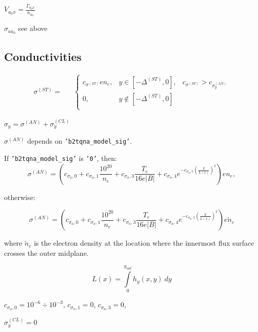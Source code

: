 \documentclass[a4paper,10pt]{report}
\begin{document}
$V_{a_{0}x}=\frac{\Gamma_{a_{0}x}}{n_{a_0}}$

$\sigma_{aa_0}$ see above

\subsection{Conductivities}

\begin{equation*}
\begin{matrix}
\sigma^{(ST)} = &
& \left\{
\begin{matrix}
c_{\sigma^{(ST)}} e n_e
, & y \in \left[ -\Delta^{(ST)},0 \right], & c_{\sigma^{(ST)}} > c_{\sigma^{(AN)}_{y}} \\
0, &  y \notin \left[ -\Delta^{(ST)},0 \right] \\
\end{matrix} \right.
\end{matrix}
\end{equation*}

$\sigma_y=\sigma^{(AN)} + \sigma^{(CL)}_{y}$

$\sigma^{(AN)}$  depends on {\tt 'b2tqna\_model\_sig'}.

If {\tt 'b2tqna\_model\_sig'} is {\tt '0'}, then:
\begin{equation*}
\sigma^{(AN)} = \left(
	c_{\sigma_a,0} + c_{\sigma_a,1} \frac{10^{20}}{n_e} +
	c_{\sigma_a,3} \frac{T_e}{16 e|B|} +
	c_{\sigma_a,4} e^{-c_{\sigma_a,5}\left(\frac y{L\left(x\right)}\right)^2}
\right) e n_e,
\end{equation*}

otherwise:

\begin{equation*}
\sigma^{(AN)} = \left(
	c_{\sigma_a,0} + c_{\sigma_a,1} \frac{10^{20}}{n_e} +
	c_{\sigma_a,3} \frac{T_e}{16 e|B|} +
	c_{\sigma_a,4} e^{-c_{\sigma_a,5}\left(\frac y{L\left(x\right)}\right)^2}
\right) e \widetilde n_e
\end{equation*}

where $\widetilde n_e$ is the electron density at the location where the innermost flux surface crosses the outer midplane.

\begin{equation*}
L\left( x \right) = \int \limits_0^{y_{out}} h_y \left( x,y \right) ~ dy
\end{equation*}

$c_{\sigma_a,0} = 10^{-6} \div 10^{-3}$,   $c_{\sigma_a,1}=0$,  $c_{\sigma_a,3}=0$,

$\sigma^{(CL)}_{y} = 0$
\end{document}
